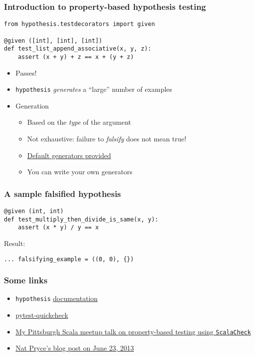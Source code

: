 \begin{frame}[fragile]
  \frametitle{Introduction to property-based hypothesis testing}

  \begin{verbatim}
from hypothesis.testdecorators import given

@given ([int], [int], [int])
def test_list_append_associative(x, y, z):
    assert (x + y) + z == x + (y + z)
  \end{verbatim}

  \begin{itemize}
  \item Passes!
  \item \texttt{hypothesis} \emph{generates} a ``large'' number of examples
  \item Generation
    \begin{itemize}
    \item Based on the \emph{type} of the argument
    \item Not exhaustive: failure to \emph{falsify} does not mean true!
    \item \href{https://github.com/DRMacIver/hypothesis/blob/master/hypothesis/searchstrategy.py}{Default generators provided}
    \item You can write your own generators
    \end{itemize}
  \end{itemize}
\end{frame}

\begin{frame}[fragile]
  \frametitle{A sample falsified hypothesis}

  \begin{verbatim}
@given (int, int)
def test_multiply_then_divide_is_same(x, y):
    assert (x * y) / y == x
  \end{verbatim}

  Result:
  \begin{verbatim}
... falsifying_example = ((0, 0), {})
  \end{verbatim}
\end{frame}

\begin{frame}
  \frametitle{Some links}

  \begin{itemize}
  \item \texttt{hypothesis} \href{https://pypi.python.org/pypi/hypothesis}{documentation}
  \item \href{https://pypi.python.org/pypi/pytest-quickcheck/}{pytest-quickcheck}
  \item \href{http://franklinchen.com/blog/2013/04/11/my-pittsburgh-scala-meetup-talk-on-property-based-testing-using-scalacheck/}{My Pittsburgh Scala meetup talk on property-based testing using \texttt{ScalaCheck}}
  \item \href{http://natpryce.com/articles/000801.html}{Nat Pryce's blog post on June 23, 2013}
  \end{itemize}
\end{frame}

